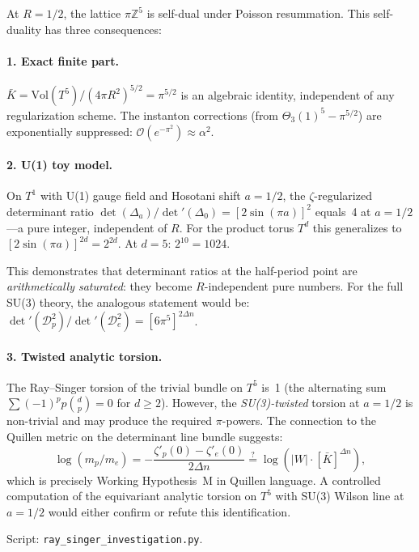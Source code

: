 At $R\!=\!1/2$, the lattice $\pi\mathbb{Z}^5$ is self-dual under
Poisson resummation.  This self-duality has three consequences:

\paragraph{1. Exact finite part.}
$\bar K=\mathrm{Vol}(T^5)/(4\pi R^2)^{5/2}=\pi^{5/2}$ is an
algebraic identity, independent of any regularization scheme.
The instanton corrections (from $\Theta_3(1)^5-\pi^{5/2}$) are
exponentially suppressed: $\mathcal{O}(e^{-\pi^2})\approx\alpha^2$.

\paragraph{2. U(1) toy model.}
On $T^1$ with U(1) gauge field and Hosotani shift $a=1/2$, the
$\zeta$-regularized determinant ratio
$\det(\Delta_a)/\det'(\Delta_0)=[2\sin(\pi a)]^2$ equals~4 at
$a=1/2$---a pure integer, independent of $R$.  For the product torus
$T^d$ this generalizes to $[2\sin(\pi a)]^{2d}=2^{2d}$.
At $d=5$: $2^{10}=1024$.

This demonstrates that determinant ratios at the half-period point
are \emph{arithmetically saturated}: they become $R$-independent pure
numbers.  For the full SU(3) theory, the analogous statement would be:
$\det'(\mathcal{D}_p^2)/\det'(\mathcal{D}_e^2)=[6\pi^5]^{2\Delta n}$.

\paragraph{3. Twisted analytic torsion.}
The Ray--Singer torsion of the trivial bundle on $T^5$ is~1 (the
alternating sum $\sum(-1)^p p\binom{d}{p}=0$ for $d\geq 2$).
However, the \emph{SU(3)-twisted} torsion at $a=1/2$ is
non-trivial and may produce the required $\pi$-powers.  The
connection to the Quillen metric on the determinant line bundle
suggests:
\[
  \log(m_p/m_e) = -\frac{\zeta'_p(0)-\zeta'_e(0)}{2\Delta n}
  \stackrel{?}{=} \log(|W|\cdot[\bar K]^{\Delta n}),
\]
which is precisely Working Hypothesis~M in Quillen language.
A controlled computation of the equivariant analytic torsion on
$T^5$ with SU(3) Wilson line at $a=1/2$ would either confirm or
refute this identification.

Script: \texttt{ray\_singer\_investigation.py}.

